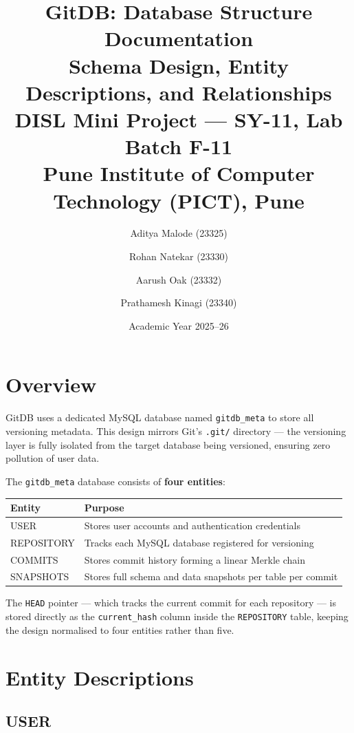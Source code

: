 \documentclass[12pt, a4paper]{article}
\title{
    \textbf{GitDB: Database Structure Documentation} \\[0.4em]
    \large Schema Design, Entity Descriptions, and Relationships \\[0.4em]
    \normalsize DISL Mini Project --- SY-11, Lab Batch F-11 \\
    Pune Institute of Computer Technology (PICT), Pune
}
\author{
    Aditya Malode (23325) \and
    Rohan Natekar (23330) \and
    Aarush Oak (23332) \and
    Prathamesh Kinagi (23340)
}
\date{Academic Year 2025--26}
\begin{document}
\maketitle
\tableofcontents
\newpage

\section{Overview}

GitDB uses a dedicated MySQL database named \texttt{gitdb\_meta} to store all
versioning metadata. This design mirrors Git's \texttt{.git/} directory --- the
versioning layer is fully isolated from the target database being versioned,
ensuring zero pollution of user data.

The \texttt{gitdb\_meta} database consists of \textbf{four entities}:

\begin{center}
\begin{tabular}{>{\ttfamily}l l}
\toprule
\textbf{Entity} & \textbf{Purpose} \\
\midrule
USER       & Stores user accounts and authentication credentials \\
REPOSITORY & Tracks each MySQL database registered for versioning \\
COMMITS    & Stores commit history forming a linear Merkle chain \\
SNAPSHOTS  & Stores full schema and data snapshots per table per commit \\
\bottomrule
\end{tabular}
\end{center}

\medskip
\noindent The \texttt{HEAD} pointer --- which tracks the current commit for each
repository --- is stored directly as the \texttt{current\_hash} column inside
the \texttt{REPOSITORY} table, keeping the design normalised to four entities
rather than five.

\section{Entity Descriptions}

\subsection{USER}
\end{document}
